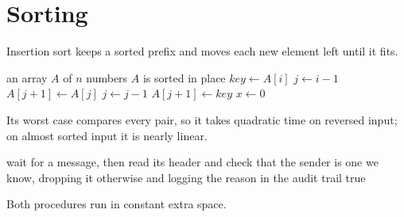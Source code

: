 \documentclass{article}
\begin{document}
\section{Sorting}
Insertion sort keeps a sorted prefix and moves each new element left until it fits.

\begin{algorithm}
\caption{Insertion sort}
\label{alg:insertion}
\begin{algorithmic}[1]
\Require an array $A$ of $n$ numbers
\Ensure $A$ is sorted in place
    \State $key \gets A[i]$ 
    \State $j \gets i - 1$
      \State $A[j+1] \gets A[j]$
      \State $j \gets j - 1$
    \EndWhile
    \State $A[j+1] \gets key$
  \EndFor
\EndProcedure
\Statex
{}
    \State $x \gets 0$
  \EndFor
\EndProcedure
\end{algorithmic}
\end{algorithm}
Its worst case compares every pair, so it takes quadratic time on reversed input; on almost sorted input it is nearly linear.

\begin{algorithm}
\caption{Polling a queue}
\begin{algorithmic}
\Loop
  \Repeat
    \State wait for a message, then read its header and check that the sender is one we know, dropping it otherwise and logging the reason in the audit trail
  \State {}
   \State \Return true \EndIf
\EndLoop
\end{algorithmic}
\end{algorithm}
Both procedures run in constant extra space.
\end{document}
